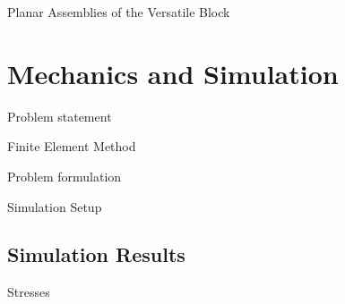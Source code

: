 \documentclass{beamer}
\numberwithin{equation}{aufgabe}
\begin{document}
\begin{frame}{Planar Assemblies of the Versatile Block}
\begin{center}
{{            }
        }
    \end{center}
\end{frame}

\section{Mechanics and Simulation}
\begin{frame}{Problem statement}
    
\end{frame}

\begin{frame}{Finite Element Method}
    
\end{frame}

\begin{frame}{Problem formulation}

\end{frame}

\begin{frame}{Simulation Setup}
    
\end{frame}

\subsection{Simulation Results}
\begin{frame}{Stresses}
    
\end{frame}
\end{document}
